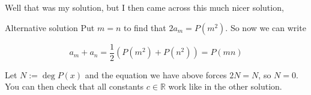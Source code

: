 \documentclass{article}
\begin{document}
Well that was my solution, but I then came across this much nicer solution,
\begin{solution}{Alternative solution}
Put $m=n$ to find that $2a_m = P\left(m^2\right)$. So now we can write

$$
a_m + a_n = \frac{1}{2} \left( P(m^2) + P(n^2) \right) = P(mn)
$$

Let $N := \deg P(x)$ and the equation we have above forces $2N = N$, so
$N=0$. You can then check that all constants $c\in\mathbb{R}$ work like in the
other solution.
\end{solution}
\end{document}
